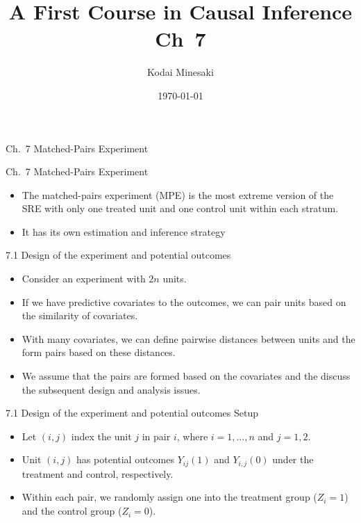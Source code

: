 \documentclass[aspectratio=169, 12pt]{beamer}
\title[]{A First Course in Causal Inference Ch~7}
\author[Kodai Minesaki]{Kodai Minesaki}
\institute[Faculty of Engineering, The University of Tokyo]{Faculty of Engineering, The University of Tokyo}
\date{\today}
\begin{document}
\begin{frame}
\titlepage
\end{frame}


\begin{frame}

  {
    \large
    Ch.~7 Matched-Pairs Experiment
  }
  
\end{frame}

\begin{frame}{Ch.~7 Matched-Pairs Experiment}
  \begin{itemize}
    \item The matched-pairs experiment (MPE) is the most extreme version of the SRE with only one treated unit and one control unit within each stratum.
    \item It has its own estimation and inference strategy
  \end{itemize}
  
\end{frame}

\begin{frame}{7.1 Design of the experiment and potential outcomes}
  \begin{itemize}
    \item Consider an experiment with $2n$ units.
    \item If we have predictive covariates to the outcomes, we can pair units based on the similarity of covariates.
    \item With many covariates, we can define pairwise distances between units and the form pairs based on these distances.
    \item We assume that the pairs are formed based on the covariates and the discuss the subsequent design and analysis issues.
  \end{itemize}
\end{frame}

\begin{frame}{7.1 Design of the experiment and potential outcomes}
    Setup
    \begin{itemize}
        \item Let $(i,j)$ index the unit $j$ in pair $i$, where $i=1,\dots,n$ and $j=1,2$.
        \item Unit $(i,j)$ has potential outcomes $Y_{ij}(1)$ and $Y_{i,j}(0)$ under the treatment and control, respectively.
        \item Within each pair, we randomly assign one into the treatment group ($Z_i=1$) and the control group ($Z_i=0$).
    \end{itemize}
\end{frame}
\end{document}
